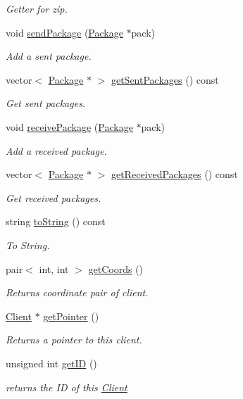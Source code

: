 \begin{DoxyCompactItemize}
\begin{DoxyCompactList}\small\item\em Getter for zip. \end{DoxyCompactList}\item 
void \hyperlink{classClient_a2127f6355c6d4fe400f3dd314e1fabc8}{send\+Package} (\hyperlink{classPackage}{Package} $\ast$pack)
\begin{DoxyCompactList}\small\item\em Add a sent package. \end{DoxyCompactList}\item 
vector$<$ \hyperlink{classPackage}{Package} $\ast$ $>$ \hyperlink{classClient_aff47cd6d18feba4c43f7ff495d73f495}{get\+Sent\+Packages} () const 
\begin{DoxyCompactList}\small\item\em Get sent packages. \end{DoxyCompactList}\item 
void \hyperlink{classClient_a1726c784a1c19701a13e12333cf906e5}{receive\+Package} (\hyperlink{classPackage}{Package} $\ast$pack)
\begin{DoxyCompactList}\small\item\em Add a received package. \end{DoxyCompactList}\item 
vector$<$ \hyperlink{classPackage}{Package} $\ast$ $>$ \hyperlink{classClient_aae2dee02f0951f418941234103c275ef}{get\+Received\+Packages} () const 
\begin{DoxyCompactList}\small\item\em Get received packages. \end{DoxyCompactList}\item 
string \hyperlink{classClient_a994ff91075daf477725ca055874e3e22}{to\+String} () const 
\begin{DoxyCompactList}\small\item\em To String. \end{DoxyCompactList}\item 
pair$<$ int, int $>$ \hyperlink{classClient_a00ea13c3af8a5eb6d931e73a5a00bdd4}{get\+Coords} ()
\begin{DoxyCompactList}\small\item\em Returns coordinate pair of client. \end{DoxyCompactList}\item 
\hyperlink{classClient}{Client} $\ast$ \hyperlink{classClient_a81f028cdd0ad080e4739d8b9ad4d757c}{get\+Pointer} ()
\begin{DoxyCompactList}\small\item\em Returns a pointer to this client. \end{DoxyCompactList}\item 
unsigned int \hyperlink{classClient_ad03bbecd42ede5870a9f537fb7c01d97}{get\+ID} ()
\begin{DoxyCompactList}\small\item\em returns the ID of this \hyperlink{classClient}{Client} \end{DoxyCompactList}\end{DoxyCompactItemize}
